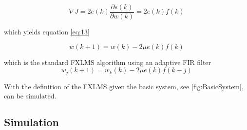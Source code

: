 \begin{equation}\label{eq:12}
\nabla J = 2e(k)\frac{\partial s(k)}{\partial w(k)} = 2e(k)f(k)
\end{equation}

which yields equation \ref{eq:13}

\begin{equation}\label{eq:13}
w(k+1) = w(k) - 2\mu e(k)f(k)
\end{equation}

which is the standard FXLMS algorithm using an adaptive FIR filter
\begin{equation}\label{eq:14}
w_j(k+1) = w_k(k) - 2\mu e(k)f(k-j)
\end{equation}

With the definition of the FXLMS given the basic system, see \autoref{fig:BasicSystem}, can be simulated.

\subsection*{Simulation} 
